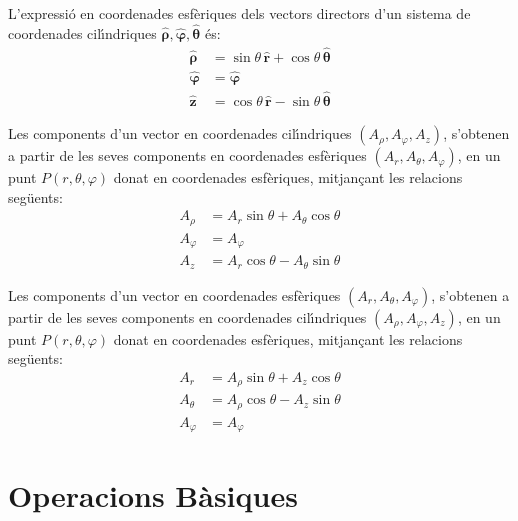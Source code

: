 \documentclass[catalan,a4paper,twoside,11pt]{article}
\begin{document}
L'expressi\'{o} en coordenades esf\`{e}riques dels vectors directors d'un sistema de coordenades  cil\'{\i}ndriques $\boldsymbol{\hat{\rho}},\boldsymbol{\hat{\varphi}},\boldsymbol{\hat{\theta}}$ \'{e}s:
\begin{subequations}\begin{align}
    \boldsymbol{\hat{\rho}} &=\sin\theta\,\boldsymbol{\hat{r}}+
    \cos\theta\,\boldsymbol{\hat{\theta}}\\
    \boldsymbol{\hat{\varphi}}&=\boldsymbol{\hat{\varphi}}\\
    \boldsymbol{\hat{z}} &=\cos\theta\,\boldsymbol{\hat{r}}-
    \sin\theta\,\boldsymbol{\hat{\theta}}
\end{align}\end{subequations}

Les components d'un vector en coordenades cil\'{\i}ndriques  $(A_\rho, A_\varphi, A_z)$, s'obtenen a partir de les seves components en coordenades esf\`{e}riques $(A_r, A_\theta, A_\varphi)$, en un punt $P(r,\theta,\varphi)$ donat en coordenades esf\`{e}riques, mitjan\c{c}ant les relacions seg\"{u}ents:
\begin{subequations}\begin{align}
    A_\rho &= A_r\sin\theta+A_\theta\cos\theta \\
    A_\varphi &= A_\varphi\\
    A_z &= A_r\cos\theta-A_\theta\sin\theta
\end{align}\end{subequations}

Les components d'un vector en coordenades esf\`{e}riques $(A_r, A_\theta, A_\varphi)$, s'obtenen a partir de les seves components en coordenades cil\'{\i}ndriques $(A_\rho, A_\varphi, A_z)$, en un punt $P(r,\theta,\varphi)$ donat en coordenades esf\`{e}riques, mitjan\c{c}ant les relacions seg\"{u}ents:
\begin{subequations}\begin{align}
    A_r &=  A_\rho\sin\theta+A_z\cos\theta\\
    A_\theta &=  A_\rho\cos\theta-A_z\sin\theta\\
    A_\varphi &= A_\varphi
\end{align}\end{subequations}


\section{Operacions  B\`{a}siques}
\renewcommand{\va}{\ensuremath{\,\boldsymbol{\hat{u}}}}
\renewcommand{\vb}{\ensuremath{\,\boldsymbol{\hat{v}}}}
\renewcommand{\vc}{\ensuremath{\,\boldsymbol{\hat{w}}}}
\end{document}
